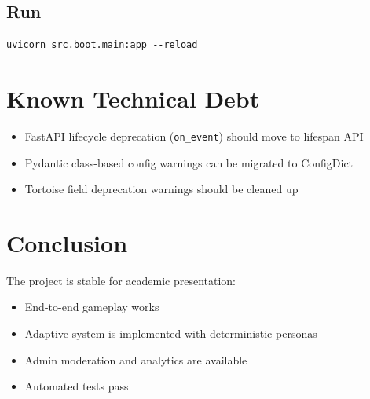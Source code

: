 \documentclass[12pt,a4paper]{article}
\begin{document}
\subsection{Run}
\begin{verbatim}
uvicorn src.boot.main:app --reload
\end{verbatim}

\section{Known Technical Debt}
\begin{itemize}[noitemsep]
  \item FastAPI lifecycle deprecation (\texttt{on\_event}) should move to lifespan API
  \item Pydantic class-based config warnings can be migrated to ConfigDict
  \item Tortoise field deprecation warnings should be cleaned up
\end{itemize}

\section{Conclusion}
The project is stable for academic presentation:
\begin{itemize}[noitemsep]
  \item End-to-end gameplay works
  \item Adaptive system is implemented with deterministic personas
  \item Admin moderation and analytics are available
  \item Automated tests pass
\end{itemize}
\end{document}
